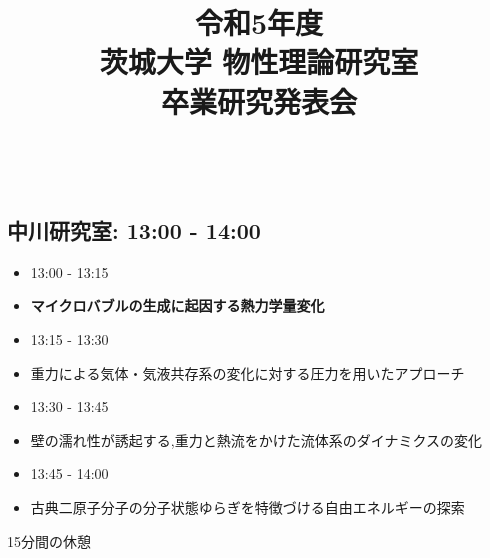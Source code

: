 \documentclass[a4paper,14pt]{jsarticle}
\begin{document}
\title{
  \vspace{-34mm} 
  {\Large
  \textsf{令和5年度} \\ 
  \textsf{茨城大学 物性理論研究室} \\ 
  \textsf{卒業研究発表会} \\
   \\ 
  }
  \vspace{-20mm}
  }
\author{}
\date{}
\pagestyle{empty} %
\maketitle

\subsection*{\textsf{中川研究室: 13:00 - 14:00}}
\begin{itemize}[label={},leftmargin=*]
    \item \textsf{13:00 - 13:15}  \item \quad \textbf{マイクロバブルの生成に起因する熱力学量変化}
    \item \textsf{13:15 - 13:30}  
    \item \quad \textsf{重力による気体・気液共存系の変化に対する圧力を用いたアプローチ}
    \item \textsf{13:30 - 13:45}  
    \item \quad \textsf{壁の濡れ性が誘起する,重力と熱流をかけた流体系のダイナミクスの変化}
    \item \textsf{13:45 - 14:00}  
    \item \quad \textsf{古典二原子分子の分子状態ゆらぎを特徴づける自由エネルギーの探索}
\end{itemize}

\vspace{3mm}

\centerline{\textsf{15分間の休憩}}
\end{document}
